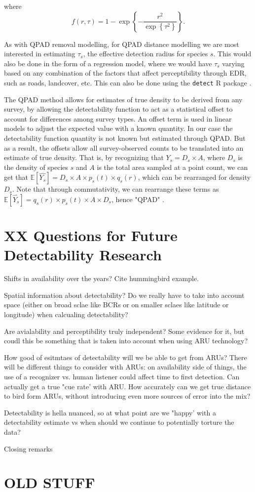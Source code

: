 where 
$$f(r,\tau) =  1 - \exp\left\{ -\dfrac{r^2}{\exp\left\{\tau^2\right\}} \right\}.$$

\par As with QPAD removal modelling, for QPAD distance modelling we are most interested in estimating $\tau_s$, the effective detection radius for species $s$. 
This would also be done in the form of a regression model, where we would have $\tau_s$ varying based on any combination of the factors that affect perceptibility through EDR, such as roads, landcover, etc.
This can also be done using the \texttt{detect} R package \citep{solymos_detect_2020}.

\par The QPAD method allows for estimates of true density to be derived from any survey, by allowing the detectability function to act as a statistical offset to account for differences among survey types. An offset term is used in linear models to adjust the expected value with a known quantity. In our case the detectability function quantity is not known but estimated through QPAD. But as a result, the offsets allow all survey-observed counts to be translated into an estimate of true density. That is, by recognizing that $Y_s = D_s \times A$, where $D_s$ is the density of species $s$ and $A$ is the total area sampled at a point count, we can get that $\mathbb{E}\left[\hat{Y_s}\right] = D_s \times A \times p_s(t) \times q_s(r)$, which can be rearranged for density $D_s$. Note that through commutativity, we can rearrange these terms as $\mathbb{E}\left[\hat{Y_s}\right] = q_s(r) \times p_s(t) \times A \times D_s$, hence "QPAD" \citep{solymos_calibrating_2013}.



\section{XX Questions for Future Detectability Research}

Shifts in availability over the years? Cite hummingbird example.

Spatial information about detectability? Do we really have to take into account space (either on broad sclae like BCRs or on smaller sclaes like latitude or longitude) when calcualing detectability?

Are avialability and perceptibility truly independent? Some evidence for it, but coudl this be something that is taken into account when using ARU technology?

How good of esitmtaes of detectability will we be able to get from ARUs? There will be different things to consider with ARUs: on availability side of things, the use of a recognizer vs. human listener could affect time to first detection. Can actually get a true "cue rate' with ARU. How accurately can we get true distance to bird form ARUs, without introducing even more sources of error into the mix?

Detectability is hella nuanced, so at what point are we "happy' with a detectability estimate vs when should we continue to potentially torture the data?

Closing remarks 

\section{OLD STUFF }


